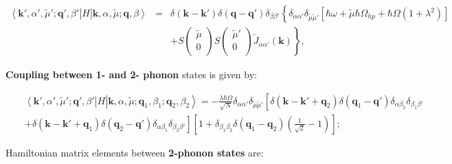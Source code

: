 \documentclass[pt12]{article}
\newcommand{\bfk}{\mathbf{k}}
\newcommand{\bfq}{\mathbf{q}}
\newcommand{\tmu}{\tilde{\mu}}
\begin{document}
\begin{eqnarray}\label{2P_H_2P}
\nonumber \left< \bfk',\alpha',\tmu'; \bfq', \beta' \right| H
\left|\bfk,\alpha,\tmu; \bfq, \beta \right> &=& \delta (\bfk-\bfk')
\delta (\bfq-\bfq') \delta_{\beta\beta'} \left\{
\delta_{\alpha\alpha'} \delta_{\tmu\tmu'} \left[\hbar \omega + \tmu
\hbar \Omega_{hp} + \hbar \Omega \left( 1+\lambda^2\right) \right]
\right. \\
&& \left. +
S\left(
                                \begin{array}{c}
                                    \tmu \\
                                    0 \\
                                  \end{array}
                                \right)
S\left(
                                \begin{array}{c}
                                    \tmu' \\
                                    0 \\
                                  \end{array}
                                \right)
\tilde{J}_{\alpha\alpha'}(\bfk)\right\},
\end{eqnarray}


\textbf{Coupling between 1- and 2- phonon} states is given by:


\begin{eqnarray}\label{3P_H_2P}
\nonumber && \left< \bfk',\alpha',\tmu'; \bfq',\beta'\right| H
\left|\bfk,\alpha,\tmu; \bfq_1,\beta_1 ; \bfq_2,\beta_2\right> =
-\frac{\lambda\hbar\Omega}{\sqrt{N}}\delta_{\alpha\alpha'}
\delta_{\tmu\tmu'} \left[
\delta(\bfk-\bfk'+\bfq_2)\delta(\bfq_1-\bfq')\delta_{\alpha\beta_2}\delta_{\beta_1\beta'}
\right.  \\ && \left. +
\delta(\bfk-\bfk'+\bfq_1)\delta(\bfq_2-\bfq')\delta_{\alpha\beta_1}\delta_{\beta_2\beta'}
\right]\left[1+\delta_{\beta_1\beta_2}\delta(\bfq_1-\bfq_2)\left(\frac{1}{\sqrt{2}}-1\right)\right];
\end{eqnarray}

Hamiltonian matrix elements between \textbf{2-phonon states} are:
\end{document}
